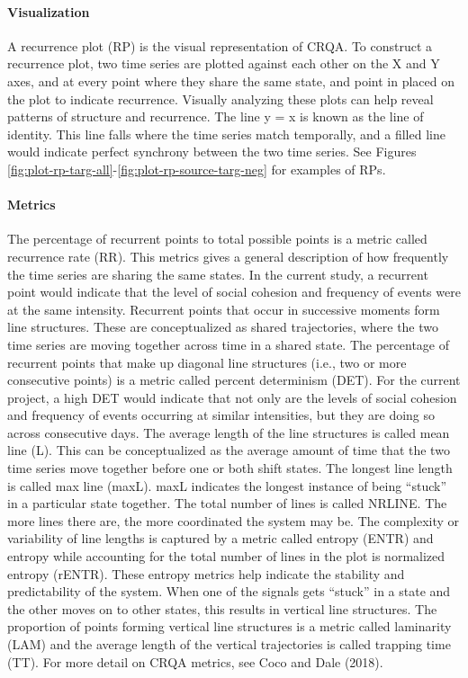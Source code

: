 \documentclass[english,man]{apa6}
\begin{document}
\hypertarget{visualization}{%
\paragraph{Visualization}\label{visualization}}

A recurrence plot (RP) is the visual representation of CRQA. To construct a recurrence plot, two time series are plotted against each other on the X and Y axes, and at every point where they share the same state, and point in placed on the plot to indicate recurrence. Visually analyzing these plots can help reveal patterns of structure and recurrence. The line y = x is known as the line of identity. This line falls where the time series match temporally, and a filled line would indicate perfect synchrony between the two time series. See Figures \ref{fig:plot-rp-targ-all}-\ref{fig:plot-rp-source-targ-neg} for examples of RPs.

\hypertarget{metrics}{%
\paragraph{Metrics}\label{metrics}}

The percentage of recurrent points to total possible points is a metric called recurrence rate (RR). This metrics gives a general description of how frequently the time series are sharing the same states. In the current study, a recurrent point would indicate that the level of social cohesion and frequency of events were at the same intensity.
Recurrent points that occur in successive moments form line structures. These are conceptualized as shared trajectories, where the two time series are moving together across time in a shared state. The percentage of recurrent points that make up diagonal line structures (i.e., two or more consecutive points) is a metric called percent determinism (DET). For the current project, a high DET would indicate that not only are the levels of social cohesion and frequency of events occurring at similar intensities, but they are doing so across consecutive days.
The average length of the line structures is called mean line (L). This can be conceptualized as the average amount of time that the two time series move together before one or both shift states. The longest line length is called max line (maxL). maxL indicates the longest instance of being \enquote{stuck} in a particular state together. The total number of lines is called NRLINE. The more lines there are, the more coordinated the system may be. The complexity or variability of line lengths is captured by a metric called entropy (ENTR) and entropy while accounting for the total number of lines in the plot is normalized entropy (rENTR). These entropy metrics help indicate the stability and predictability of the system. When one of the signals gets \enquote{stuck} in a state and the other moves on to other states, this results in vertical line structures. The proportion of points forming vertical line structures is a metric called laminarity (LAM) and the average length of the vertical trajectories is called trapping time (TT). For more detail on CRQA metrics, see Coco and Dale (2018).
\end{document}
